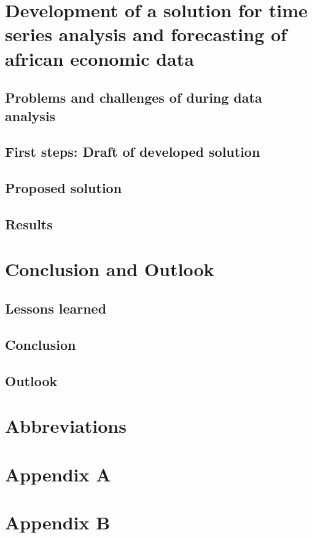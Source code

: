 
\chapter{Development of a solution for time series analysis and forecasting of african economic data}\label{development}
\section{Problems and challenges of during data analysis}\label{problems_challenges}

\section{First steps: Draft of developed solution}\label{draft}

\section{Proposed solution}\label{proposed_solution}

\section{Results}\label{results}

\chapter{Conclusion and Outlook}\label{conclusion_outlook}
\section{Lessons learned}\label{lessons_learned}

\section{Conclusion}\label{conclusion}

\section{Outlook}\label{outlook}

\chapter{Abbreviations}

\printbibliography

\chapter{Appendix A}\label{appendix a}

\chapter{Appendix B}\label{appendix b}
%


